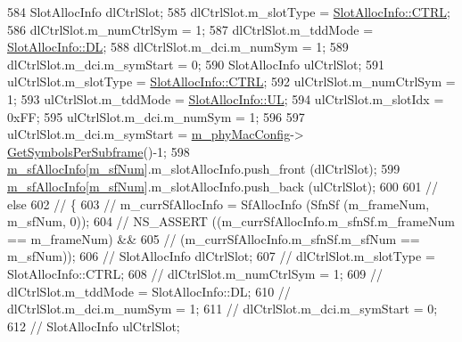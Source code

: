 \begin{DoxyCode}
584         SlotAllocInfo dlCtrlSlot;
585         dlCtrlSlot.m\_slotType = \hyperlink{structns3_1_1SlotAllocInfo_a3ea7cb503bfd0c9a4df55a71b81b9331ad78b7d76ef82d56c33be1fa9c1867409}{SlotAllocInfo::CTRL};
586         dlCtrlSlot.m\_numCtrlSym = 1;
587         dlCtrlSlot.m\_tddMode = \hyperlink{structns3_1_1SlotAllocInfo_a6cad60db1d39034f1851e2cea625fe5da9a365c9c56b7c32dcae38ee1a468ce6d}{SlotAllocInfo::DL};
588         dlCtrlSlot.m\_dci.m\_numSym = 1;
589         dlCtrlSlot.m\_dci.m\_symStart = 0;
590         SlotAllocInfo ulCtrlSlot;
591         ulCtrlSlot.m\_slotType = \hyperlink{structns3_1_1SlotAllocInfo_a3ea7cb503bfd0c9a4df55a71b81b9331ad78b7d76ef82d56c33be1fa9c1867409}{SlotAllocInfo::CTRL};
592         ulCtrlSlot.m\_numCtrlSym = 1;
593         ulCtrlSlot.m\_tddMode = \hyperlink{structns3_1_1SlotAllocInfo_a6cad60db1d39034f1851e2cea625fe5da916b5be54594ead6ed677c570311cad2}{SlotAllocInfo::UL};
594         ulCtrlSlot.m\_slotIdx = 0xFF;
595         ulCtrlSlot.m\_dci.m\_numSym = 1;
596 
597         ulCtrlSlot.m\_dci.m\_symStart = \hyperlink{classns3_1_1MmWavePhy_a869abf36bbdbb94eed77ba6e4846f6e4}{m\_phyMacConfig}->
      \hyperlink{classns3_1_1MmWavePhyMacCommon_a2fe835b76e3c689defa413e395cd10cb}{GetSymbolsPerSubframe}()-1;
598         \hyperlink{classns3_1_1MmWavePhy_a6e7002b99b8c50976033e0b96523f08c}{m\_sfAllocInfo}[\hyperlink{classns3_1_1MmWavePhy_af3d76eb9f3e5e1ff669852d05986c1a3}{m\_sfNum}].m\_slotAllocInfo.push\_front (dlCtrlSlot);
599         \hyperlink{classns3_1_1MmWavePhy_a6e7002b99b8c50976033e0b96523f08c}{m\_sfAllocInfo}[\hyperlink{classns3_1_1MmWavePhy_af3d76eb9f3e5e1ff669852d05986c1a3}{m\_sfNum}].m\_slotAllocInfo.push\_back (ulCtrlSlot);
600 
601         \textcolor{comment}{// else}
602         \textcolor{comment}{// \{            }
603         \textcolor{comment}{//      m\_currSfAllocInfo = SfAllocInfo (SfnSf (m\_frameNum, m\_sfNum, 0));}
604         \textcolor{comment}{//      NS\_ASSERT ((m\_currSfAllocInfo.m\_sfnSf.m\_frameNum == m\_frameNum) &&}
605         \textcolor{comment}{//                 (m\_currSfAllocInfo.m\_sfnSf.m\_sfNum == m\_sfNum));}
606         \textcolor{comment}{//      SlotAllocInfo dlCtrlSlot;}
607         \textcolor{comment}{//      dlCtrlSlot.m\_slotType = SlotAllocInfo::CTRL;}
608         \textcolor{comment}{//      dlCtrlSlot.m\_numCtrlSym = 1;}
609         \textcolor{comment}{//      dlCtrlSlot.m\_tddMode = SlotAllocInfo::DL;}
610         \textcolor{comment}{//      dlCtrlSlot.m\_dci.m\_numSym = 1;}
611         \textcolor{comment}{//      dlCtrlSlot.m\_dci.m\_symStart = 0;}
612         \textcolor{comment}{//      SlotAllocInfo ulCtrlSlot;}

\end{DoxyCode}

